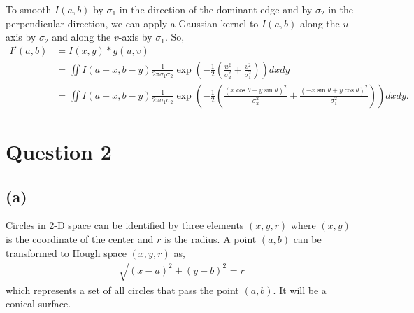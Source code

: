 \documentclass[a4paper,10pt]{article}
\begin{document}
To smooth $I(a, b)$ by $\sigma_1$ in the direction of the dominant edge and by $\sigma_2$ in the perpendicular direction,
we can apply a Gaussian kernel to $I(a, b)$ along the $u$-axis by $\sigma_2$ and along the $v$-axis by $\sigma_1$.
So,
\begin{align*}
I'(a, b) &= I(x, y) * g(u, v) \\
&= \iint I(a - x, b - y) \frac{1}{2\pi \sigma_1 \sigma_2} \exp \left( -\frac{1}{2}\left(\frac{u^2}{\sigma_2^2} + \frac{v^2}{\sigma_1^2}\right) \right) dx dy \\
&= \iint I(a - x, b - y) \frac{1}{2\pi \sigma_1 \sigma_2} \exp \left( -\frac{1}{2}\left(\frac{(x \cos \theta + y \sin \theta)^2}{\sigma_2^2} + \frac{(-x \sin \theta + y \cos \theta)^2}{\sigma_1^2}\right) \right) dx dy .
\end{align*}

\section*{Question 2}

\subsection*{(a)}

Circles in 2-D space can be identified by three elements $(x, y, r)$ where $(x, y)$ is the coordinate of the center and $r$ is the radius.
A point $(a, b)$ can be transformed to Hough space $(x, y, r)$ as,
\begin{align*}
\sqrt{ (x - a)^2 + (y - b)^2 } = r
\end{align*}
which represents a set of all circles that pass the point $(a, b)$.
It will be a conical surface.
\end{document}
